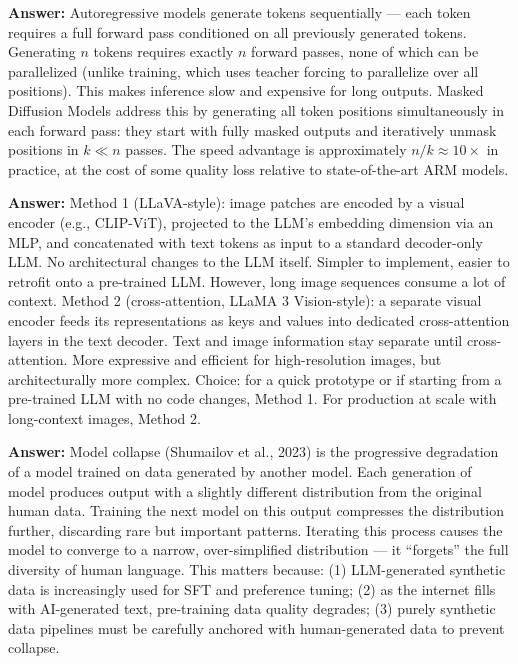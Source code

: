 \documentclass[11pt, a4paper]{article}
\begin{document}
\begin{notebox}
\textbf{Answer:} Autoregressive models generate tokens sequentially --- each token requires a full forward pass conditioned on all previously generated tokens. Generating $n$ tokens requires exactly $n$ forward passes, none of which can be parallelized (unlike training, which uses teacher forcing to parallelize over all positions). This makes inference slow and expensive for long outputs. Masked Diffusion Models address this by generating all token positions simultaneously in each forward pass: they start with fully masked outputs and iteratively unmask positions in $k \ll n$ passes. The speed advantage is approximately $n/k \approx 10\times$ in practice, at the cost of some quality loss relative to state-of-the-art ARM models.
\end{notebox}

\begin{notebox}
\textbf{Answer:} Method 1 (LLaVA-style): image patches are encoded by a visual encoder (e.g., CLIP-ViT), projected to the LLM's embedding dimension via an MLP, and concatenated with text tokens as input to a standard decoder-only LLM. No architectural changes to the LLM itself. Simpler to implement, easier to retrofit onto a pre-trained LLM. However, long image sequences consume a lot of context. Method 2 (cross-attention, LLaMA 3 Vision-style): a separate visual encoder feeds its representations as keys and values into dedicated cross-attention layers in the text decoder. Text and image information stay separate until cross-attention. More expressive and efficient for high-resolution images, but architecturally more complex. Choice: for a quick prototype or if starting from a pre-trained LLM with no code changes, Method 1. For production at scale with long-context images, Method 2.
\end{notebox}

\begin{notebox}
\textbf{Answer:} Model collapse (Shumailov et al., 2023) is the progressive degradation of a model trained on data generated by another model. Each generation of model produces output with a slightly different distribution from the original human data. Training the next model on this output compresses the distribution further, discarding rare but important patterns. Iterating this process causes the model to converge to a narrow, over-simplified distribution --- it ``forgets'' the full diversity of human language. This matters because: (1) LLM-generated synthetic data is increasingly used for SFT and preference tuning; (2) as the internet fills with AI-generated text, pre-training data quality degrades; (3) purely synthetic data pipelines must be carefully anchored with human-generated data to prevent collapse.
\end{notebox}
\end{document}
